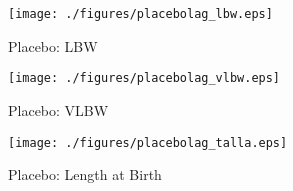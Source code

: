 \documentclass[10pt,letterpaper,subeqn]{beamer}
\begin{document}
\begin{frame}
\begin{figure}[htpb!]
  \begin{center}
  \centering
  \caption{Placebo: LBW}
  \texttt{[image: ./figures/placebolag\_lbw.eps]}
\end{center}
\end{figure}
\footnotesize{\hyperlink{Placebo}{}}
\end{frame}

\begin{frame}
\begin{figure}[htpb!]
  \begin{center}
  \centering
  \caption{Placebo: VLBW}
  \texttt{[image: ./figures/placebolag\_vlbw.eps]}
\end{center}
\end{figure}
\footnotesize{\hyperlink{Placebo}{}}
\end{frame}

\begin{frame}
\begin{figure}[htpb!]
  \begin{center}
  \centering
  \caption{Placebo: Length at Birth}
  \texttt{[image: ./figures/placebolag\_talla.eps]}
\end{center}
\end{figure}
\footnotesize{\hyperlink{Placebo}{}}
\end{frame}
\end{document}
